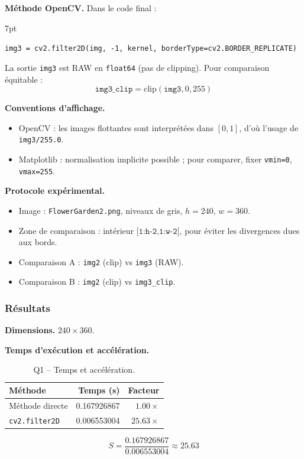 \documentclass[11pt,a4paper]{article}
\newenvironment{formal}{%
\def\FrameCommand{%
  \hspace{1pt}%
  {\color{enstaBleuFonce}\vrule width 2pt}%
  {\color{formalshade}\vrule width 4pt}%
  \colorbox{formalshade}%
}%
\MakeFramed{\advance\hsize-\width\FrameRestore}%
\noindent\hspace{-4.55pt}%
\begin{adjustwidth}{}{7pt}%
\vspace{4pt}%
}{%
\vspace{4pt}\end{adjustwidth}\endMakeFramed%
}
\begin{document}
\textbf{Méthode OpenCV.} Dans le code final :
\begin{formal}
\texttt{img3 = cv2.filter2D(img, -1, kernel, borderType=cv2.BORDER\_REPLICATE)}
\end{formal}
La sortie \texttt{img3} est RAW en \texttt{float64} (pas de clipping). Pour comparaison équitable :
\[
\texttt{img3\_clip}=\mathrm{clip}(\texttt{img3},0,255)
\]

\textbf{Conventions d'affichage.}
\begin{itemize}[leftmargin=1.5em]
  \item OpenCV : les images flottantes sont interprétées dans \([0,1]\), d'où l'usage de \texttt{img3/255.0}.
  \item Matplotlib : normalisation implicite possible ; pour comparer, fixer \texttt{vmin=0}, \texttt{vmax=255}.
\end{itemize}

\textbf{Protocole expérimental.}
\begin{itemize}[leftmargin=1.5em]
  \item Image : \texttt{FlowerGarden2.png}, niveaux de gris, \(h=240\), \(w=360\).
  \item Zone de comparaison : intérieur \(\texttt{[1:h-2,1:w-2]}\), pour éviter les divergences dues aux bords.
  \item Comparaison A : \texttt{img2} (clip) vs \texttt{img3} (RAW).
  \item Comparaison B : \texttt{img2} (clip) vs \texttt{img3\_clip}.
\end{itemize}

\subsubsection{Résultats}
\textbf{Dimensions.} \(240 \times 360\).

\textbf{Temps d'exécution et accélération.}
\begin{table}[H]
  \centering
  \caption{Q1 -- Temps et accélération.}
  \label{tab:q1-temps}
  \begin{tabular}{@{}lrr@{}}
    \toprule
    Méthode & Temps (s) & Facteur \\
    \midrule
    Méthode directe & 0.167926867 & \(1.00\times\) \\
    \texttt{cv2.filter2D} & 0.006553004 & \(25.63\times\) \\
    \bottomrule
  \end{tabular}
\end{table}
\[
S=\frac{0.167926867}{0.006553004}\approx 25.63
\]
\end{document}
